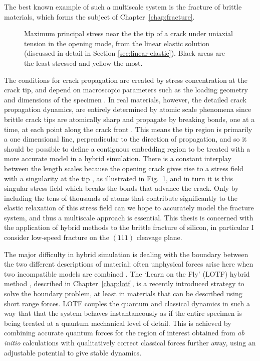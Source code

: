 The best known example of such a multiscale system is the fracture of
brittle materials, which forms the subject of
Chapter~\ref{chap:fracture}.
%
\begin{figure}
  \begin{center}
  \end{center}
  \caption[Continuum stress field near crack tip]{
    \label{fig:continuum-stress} 
    Maximum principal stress near the the tip of a crack under
    uniaxial tension in the opening mode, from the linear elastic
    solution (discussed in detail in Section
    \ref{sec:linear-elastic}). Black areas are the least stressed and
    yellow the most.}
\end{figure}
%
The conditions for crack propagation are created by stress
concentration at the crack tip, and depend on macroscopic parameters
such as the loading geometry and dimensions of the specimen
\citep{Inglis13,Griffith,Broberg99,Freund90}.
%
In real materials, however, the detailed crack propagation dynamics,
are entirely determined by atomic scale phenomena since brittle crack
tips are atomically sharp and propagate by breaking bonds, one at a
time, at each point along the crack front \citep{Lawn93,Thomson86}.
%
This means the tip region is primarily a one dimensional line,
perpendicular to the direction of propagation, and so it should be
possible to define a contiguous embedding region to be treated with a
more accurate model in a hybrid simulation.
%
There is a constant interplay between the length scales because the
opening crack gives rise to a stress field with a singularity at the
tip \citep{Irwin}, as illustrated in Fig.~\ref{fig:continuum-stress},
and in turn it is this singular stress field which breaks the bonds
that advance the crack.
%
Only by including the tens of thousands of atoms that contribute
significantly to the elastic relaxation of this stress field can we
hope to accurately model the fracture system, and thus a multiscale
approach is essential.
%
This thesis is concerned with the application of hybrid methods to the
brittle fracture of silicon, in particular I consider low-speed
fracture on the $(111)$ cleavage plane.

The major difficulty in hybrid simulation is dealing with the boundary
between the two different descriptions of material; often unphysical
forces arise here when two incompatible models are combined
\citep{Spence93,Broughton99,Bernstein01}.
%
The `Learn on the Fly' (LOTF) hybrid method
\citep{LOTF98,LOTF04,LOTF05,Moras06,DefectBook}, described in
Chapter~\ref{chap:lotf}, is a recently introduced strategy to solve
the boundary problem, at least in materials that can be described
using short range forces.
%
LOTF couples the quantum and classical dynamics in such a way that
that the system behaves instantaneously as if the entire specimen is
being treated at a quantum mechanical level of detail.
%
This is achieved by combining accurate quantum forces for the region
of interest obtained from \emph{ab initio} calculations with
qualitatively correct classical forces further away, using an
adjustable potential to give stable dynamics.

